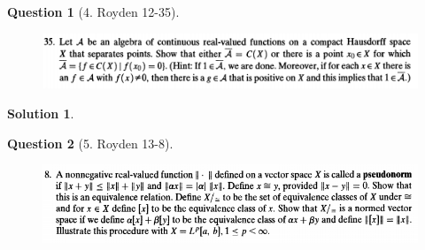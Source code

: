 \documentclass{article} %
\theoremstyle{quest}
\newtheorem*{question}{Question}
\newtheorem*{solution}{Solution}
\begin{document}
\newpage

\begin{question}[4. Royden 12-35]
\hfill
\begin{figure}[h!]
  \centering
    \includegraphics[width=1\textwidth]{12-35}
\end{figure}
\end{question}
\begin{solution}

\end{solution}

\newpage

\begin{question}[5. Royden 13-8]
\hfill
\begin{figure}[h!]
  \centering
    \includegraphics[width=1\textwidth]{13-8}
\end{figure}
\end{question}
\end{document}
